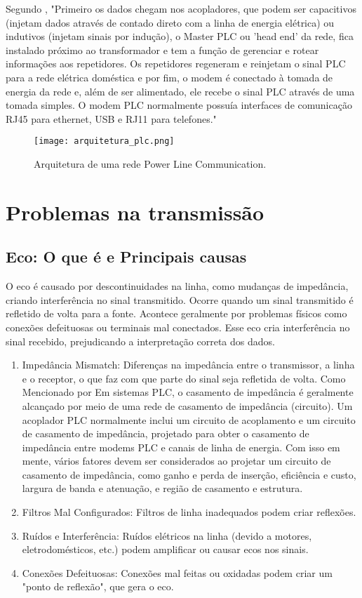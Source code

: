 \documentclass[12pt]{article}
\begin{document}
Segundo \cite{devmedia}, "Primeiro os dados chegam nos acopladores, que podem ser capacitivos (injetam dados através de contado direto com a linha de energia elétrica) ou indutivos (injetam sinais por indução), o Master PLC ou 'head end' da rede, fica instalado próximo ao transformador e tem a função de gerenciar e rotear informações aos repetidores. Os repetidores regeneram e reinjetam o sinal PLC para a rede elétrica doméstica e por fim, o modem é conectado à tomada de energia da rede e, além de ser alimentado, ele recebe o sinal PLC através de uma tomada simples. O modem PLC normalmente possuía interfaces de comunicação RJ45 para ethernet, USB e RJ11 para telefones." 

\begin{figure}[H]
    \centering
    \texttt{[image: arquitetura\_plc.png]}
    \caption{Arquitetura de uma rede Power Line Communication.}
    \label{fig:Figura}
\end{figure}

\section{Problemas na transmissão}

\subsection{Eco: O que é e Principais causas}
O eco é causado por descontinuidades na linha, como mudanças de impedância, criando interferência no sinal transmitido. Ocorre quando um sinal transmitido é refletido de volta para a fonte. Acontece geralmente por problemas físicos como conexões defeituosas ou terminais mal conectados. Esse eco cria interferência no sinal recebido, prejudicando a interpretação correta dos dados.

\begin{enumerate}
\item Impedância Mismatch: Diferenças na impedância entre o transmissor, a linha e o receptor, o que faz com que parte do sinal seja refletida de volta. Como Mencionado por \cite{wang2019} Em sistemas PLC, o casamento de impedância é geralmente alcançado por meio de uma rede de casamento de impedância (circuito). Um acoplador PLC normalmente inclui um circuito de acoplamento e um circuito de casamento de impedância, projetado para obter o casamento de impedância entre modems PLC e canais de linha de energia. Com isso em mente, vários fatores devem ser considerados ao projetar um circuito de casamento de impedância, como ganho e perda de inserção, eficiência e custo, largura de banda e atenuação, e região de casamento e estrutura.
\item Filtros Mal Configurados: Filtros de linha inadequados podem criar reflexões.
\item Ruídos e Interferência: Ruídos elétricos na linha (devido a motores, eletrodomésticos, etc.) podem amplificar ou causar ecos nos sinais.
\item Conexões Defeituosas: Conexões mal feitas ou oxidadas podem criar um "ponto de reflexão", que gera o eco.
\end{enumerate}
\end{document}
